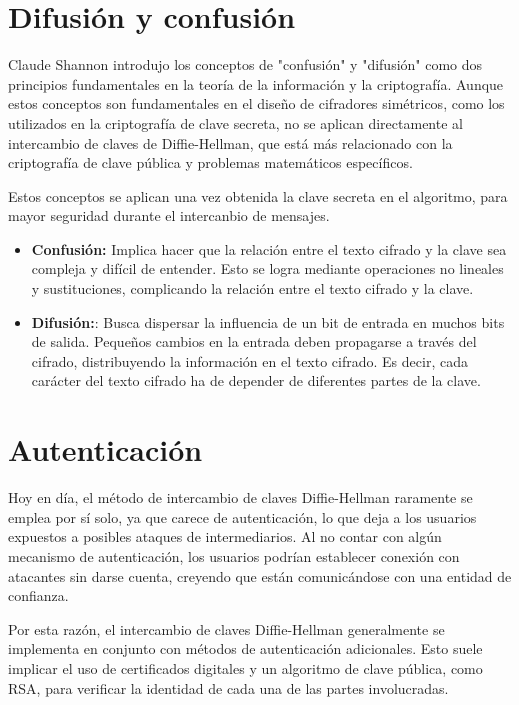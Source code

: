 \documentclass[11pt]{article}
\begin{document}
\section{Difusión y confusión}

Claude Shannon introdujo los conceptos de "confusión" y "difusión" como dos principios fundamentales en la teoría de la información y la criptografía. Aunque estos conceptos son fundamentales en el diseño de cifradores simétricos, como los utilizados en la criptografía de clave secreta, no se aplican directamente al intercambio de claves de Diffie-Hellman, que está más relacionado con la criptografía de clave pública y problemas matemáticos específicos.

Estos conceptos se aplican una vez obtenida la clave secreta en el algoritmo, para mayor seguridad durante el intercanbio de mensajes.

\begin{itemize}
	\item \textbf{Confusión:} Implica hacer que la relación entre el texto cifrado y la clave sea compleja y difícil de entender. Esto se logra mediante operaciones no lineales y sustituciones, complicando la relación entre el texto cifrado y la clave.

	\item \textbf{Difusión:}: Busca dispersar la influencia de un bit de entrada en muchos bits de salida. Pequeños cambios en la entrada deben propagarse a través del cifrado, distribuyendo la información en el texto cifrado. Es decir, cada carácter del texto cifrado ha de depender de diferentes partes de la clave.
\end{itemize}

\section{Autenticación}

Hoy en día, el método de intercambio de claves Diffie-Hellman raramente se emplea por sí solo, ya que carece de autenticación, lo que deja a los usuarios expuestos a posibles ataques de intermediarios. Al no contar con algún mecanismo de autenticación, los usuarios podrían establecer conexión con atacantes sin darse cuenta, creyendo que están comunicándose con una entidad de confianza.

Por esta razón, el intercambio de claves Diffie-Hellman generalmente se implementa en conjunto con métodos de autenticación adicionales. Esto suele implicar el uso de certificados digitales y un algoritmo de clave pública, como RSA, para verificar la identidad de cada una de las partes involucradas.
\end{document}
